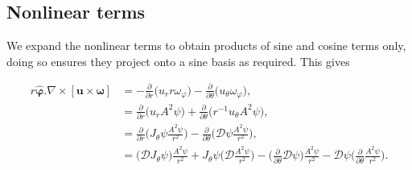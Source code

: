 \documentclass[a4paper]{article}
\begin{document}
\subsection{Nonlinear terms}\label{sec:Non_Linear_Terms_Formulation}

We expand the nonlinear terms to obtain products of sine and cosine terms only, doing so ensures they project onto a sine basis as required. This gives 

\begin{equation}
\begin{aligned}
r \boldsymbol{\hat{\varphi}}.\nabla \times [\boldsymbol{u} \times \boldsymbol{\omega}] &= - \frac{\partial }{\partial r} \bigg( u_r r \omega_{\varphi} \bigg) - \frac{\partial }{\partial \theta} \bigg( u_{\theta} \omega_{\varphi}  \bigg),\\
		&= \frac{\partial }{\partial r} \bigg( u_r A^2 \psi \bigg)+ \frac{\partial }{\partial \theta} \bigg( r^{-1}u_{\theta} A^2 \psi  \bigg), \\
		&= \frac{\partial }{\partial r} \bigg( J_{\theta} \psi \frac{A^2 \psi}{r^2} \bigg) - \frac{\partial }{\partial \theta} \bigg( \mathcal{D}\psi \frac{A^2 \psi}{r^2}  \bigg), \\   
		&= \bigg( \mathcal{D} J_{\theta} \psi \bigg) \frac{A^2 \psi}{r^2} + J_{\theta} \psi  \bigg( \mathcal{D} \frac{A^2 \psi}{r^2} \bigg)  - \bigg(  \frac{\partial }{\partial \theta} \mathcal{D}\psi \bigg) \frac{A^2 \psi}{r^2}  - \mathcal{D}\psi \bigg(  \frac{\partial }{\partial \theta} \frac{A^2 \psi}{r^2} \bigg).
\label{eq:Num_StreamF}
\end{aligned}
\end{equation}
\end{document}
